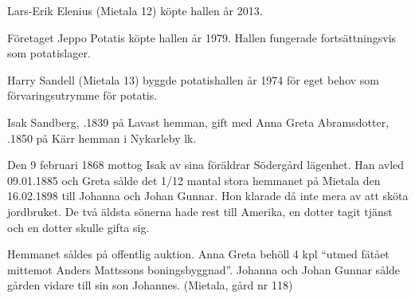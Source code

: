 

Lars-Erik Elenius (Mietala 12) köpte hallen år 2013.\jhvspace{}


Företaget Jeppo Potatis köpte hallen år 1979. Hallen fungerade fortsättningsvis som potatislager.\jhvspace{}


Harry Sandell (Mietala 13) byggde potatishallen år 1974 för eget behov som förvaringsutrymme för potatis.\jhvspace{}





Isak Sandberg, .1839 på Lavast hemman, gift med Anna Greta Abramsdotter,  .1850 på Kärr hemman i Nykarleby lk.
\begin{jhchildren}
  \item {}
  \item {}
  \item {}
  \item {}
  \item {}
  \item {}
  \item {}
\end{jhchildren}

Den 9 februari 1868 mottog Isak av sina föräldrar Södergård lägenhet. Han avled 09.01.1885 och Greta sålde det 1/12 mantal stora hemmanet på Mietala den 16.02.1898 till Johanna och Johan Gunnar. Hon klarade då inte mera av att sköta jordbruket. De två äldsta sönerna hade rest till Amerika, en dotter tagit tjänst och en dotter skulle gifta sig.

Hemmanet såldes på offentlig auktion. Anna Greta behöll 4 kpl ``utmed fätået mittemot Anders Mattssons boningsbyggnad''. Johanna och Johan Gunnar sålde gården vidare till sin son Johannes. (Mietala, gård nr 118)


